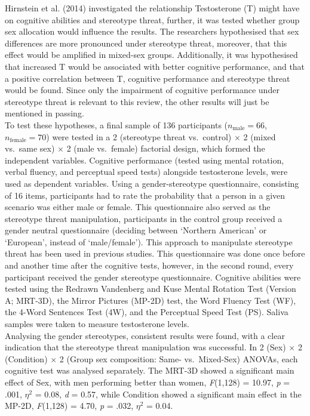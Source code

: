 \documentclass[
  stu,floatsintext]{apa7}
\begin{document}
Hirnstein et al. (2014) investigated the relationship Testosterone (T) might have on cognitive abilities and stereotype threat, further, it was tested whether group sex allocation would influence the results.
The researchers hypothesised that sex differences are more pronounced under stereotype threat, moreover, that this effect would be amplified in mixed-sex groups.
Additionally, it was hypothesised that increased T would be associated with better cognitive performance, and that a positive correlation between T, cognitive performance and stereotype threat would be found.
Since only the impairment of cognitive performance under stereotype threat is relevant to this review, the other results will just be mentioned in passing.\\
To test these hypotheses, a final sample of 136 participants (\(n_{\text{male}} = 66\), \(n_{\text{female}} = 70\)) were tested in a 2 (stereotype threat vs.~control) \(\times\) 2 (mixed vs.~same sex) \(\times\) 2 (male vs.~female) factorial design, which formed the independent variables.
Cognitive performance (tested using mental rotation, verbal fluency, and perceptual speed tests) alongside testosterone levels, were used as dependent variables.
Using a gender-stereotype questionnaire, consisting of 16 items, participants had to rate the probability that a person in a given scenario was either male or female.
This questionnaire also served as the stereotype threat manipulation, participants in the control group received a gender neutral questionnaire (deciding between `Northern American' or `European', instead of `male/female').
This approach to manipulate stereotype threat has been used in previous studies.
This questionnaire was done once before and another time after the cognitive tests, however, in the second round, every participant received the gender stereotype questionnaire.
Cognitive abilities were tested using the Redrawn Vandenberg and Kuse Mental Rotation Test (Version A; MRT-3D), the Mirror Pictures (MP-2D) test, the Word Fluency Test (WF), the 4-Word Sentences Test (4W), and the Perceptual Speed Test (PS).
Saliva samples were taken to measure testosterone levels.\\
Analysing the gender stereotypes, consistent results were found, with a clear indication that the stereotype threat manipulation was successful.
In 2 (Sex) \(\times\) 2 (Condition) \(\times\) 2 (Group sex composition: Same- vs.~Mixed-Sex) ANOVAs, each cognitive test was analysed separately.
The MRT-3D showed a significant main effect of Sex, with men performing better than women, \emph{F}(1,128) = 10.97, \emph{p} = .001, \(\eta^{2}\) = 0.08, \emph{d} = 0.57, while Condition showed a significant main effect in the MP-2D, \emph{F}(1,128) = 4.70, \emph{p} = .032, \(\eta^{2}\) = 0.04.
\end{document}
